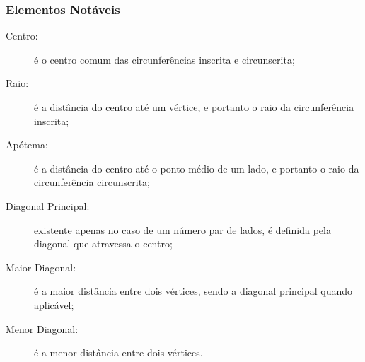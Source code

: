     \subsubsection{Elementos Notáveis}
        \begin{description}
            \item[Centro:] é o centro comum das circunferências inscrita e circunscrita;
            \item[Raio:] é a distância do centro até um vértice, e portanto o raio da circunferência inscrita;
            \item[Apótema:] é a distância do centro até o ponto médio de um lado, e portanto o raio da circunferência circunscrita;
            \item[Diagonal Principal:] existente apenas no caso de um número par de lados, é definida pela diagonal que atravessa o centro;
            \item[Maior Diagonal:] é a maior distância entre dois vértices, sendo a diagonal principal quando aplicável;
            \item[Menor Diagonal:] é a menor distância entre dois vértices.
        \end{description}

